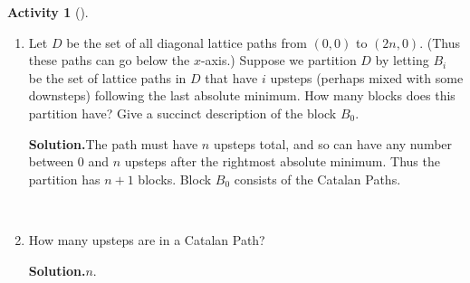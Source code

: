 \documentclass[10pt,]{book}
\theoremstyle{plain}
\theoremstyle{definition}
\newtheorem{activity}[project]{Activity}
\numberwithin{equation}{chapter}
\begin{document}
\begin{activity}[]
\begin{enumerate}[label=(\alph*)]
~\par
\item Let \(D\) be the set of all diagonal lattice paths from \((0,0)\) to \((2n,0)\).  (Thus these paths can go below the \(x\)-axis.) Suppose we partition \(D\) by letting \(B_i\) be the set of lattice paths in \(D\) that have \(i\) upsteps (perhaps mixed with some downsteps) following the last absolute minimum.  How many blocks does this partition have?  Give a succinct description of the block \(B_0\).%
\par\medskip\noindent%
\textbf{Solution.}\quad The path must have \(n\) upsteps total, and so can have any number between 0 and \(n\) upsteps after the rightmost absolute minimum. Thus the partition has \(n+1\) blocks. Block \(B_0\) consists of the Catalan Paths.%

~\par
\item How many upsteps are in a Catalan Path?%
\par\medskip\noindent%
\textbf{Solution.}\quad \(n\).%


\end{enumerate}
\end{activity}
\end{document}
